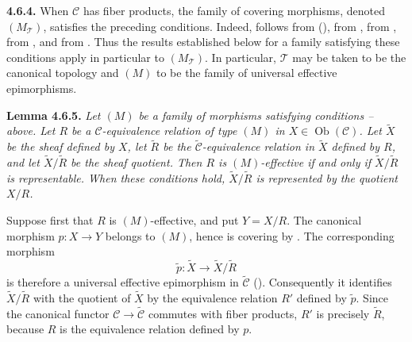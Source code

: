 \medskip
\noindent{}\textbf{4.6.4.}
When \(\mathscr C\) has fiber products, the family of covering morphisms,
denoted \((M_{\mathcal T})\), satisfies the preceding conditions. Indeed,
 follows from  (),  from ,  from ,
 from , and
 from . Thus the results established below for
a family satisfying these conditions apply in particular to
\((M_{\mathcal T})\). In particular, \(\mathcal T\) may be taken to be
the canonical topology and \((M)\) to be the family of universal
effective epimorphisms.

\medskip
\noindent{}\textbf{Lemma 4.6.5.}
\textit{Let \((M)\) be a family of morphisms satisfying conditions
-- above. Let \(R\) be a
\(\mathscr C\)-equivalence relation of type \((M)\) in
\(X\in\operatorname{Ob}(\mathscr C)\). Let \(\widetilde X\) be the
sheaf defined by \(X\), let \(\widetilde R\) be the
\(\widetilde{\mathscr C}\)-equivalence relation in \(\widetilde X\)
defined by \(R\), and let \(\widetilde X/\widetilde R\) be the sheaf
quotient. Then \(R\) is \((M)\)-effective if and only if
\(\widetilde X/\widetilde R\) is representable. When these conditions
hold, \(\widetilde X/\widetilde R\) is represented by the quotient
\(X/R\).}

Suppose first that \(R\) is \((M)\)-effective, and put \(Y=X/R\). The
canonical morphism \(p:X\to Y\) belongs to \((M)\), hence is covering by
. The corresponding morphism
\[
 \widetilde p:\widetilde X\longrightarrow
 \widetilde X/\widetilde R
\]
is therefore a universal effective epimorphism in
\(\widetilde{\mathscr C}\) (). Consequently it identifies
\(\widetilde X/\widetilde R\) with the quotient of \(\widetilde X\) by
the equivalence relation \(R'\) defined by \(\widetilde p\). Since the
canonical functor \(\mathscr C\to\widetilde{\mathscr C}\) commutes with
fiber products, \(R'\) is precisely \(\widetilde R\), because \(R\) is
the equivalence relation defined by \(p\).

